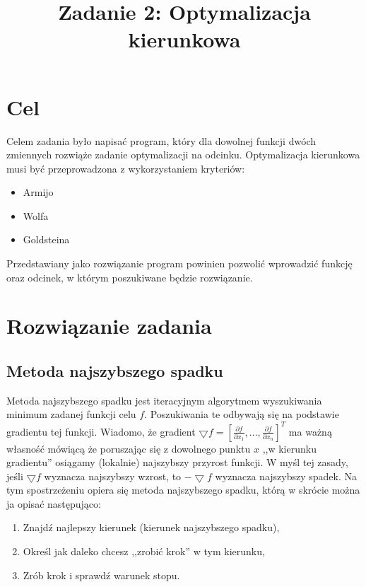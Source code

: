 \documentclass{classrep}
\author{
  \studentinfo{Paweł Musiał}{178726} \and
  \studentinfo{Łukasz Michalski}{178724}
}
\title{Zadanie 2: Optymalizacja kierunkowa}
\begin{document}
\maketitle


\addtocounter{footnote}{1}

\section{Cel}
Celem zadania było napisać program, który dla dowolnej funkcji dwóch zmiennych rozwiąże zadanie optymalizacji na odcinku. Optymalizacja kierunkowa musi być przeprowadzona z wykorzystaniem kryteriów:
\begin{itemize}
\item Armijo
\item Wolfa
\item Goldsteina
\end{itemize}
Przedstawiany jako rozwiązanie program powinien pozwolić wprowadzić funkcję oraz odcinek, w którym poszukiwane będzie rozwiązanie.

\section{Rozwiązanie zadania}
\subsection{Metoda najszybszego spadku}
Metoda najszybszego spadku jest iteracyjnym algorytmem wyszukiwania minimum zadanej funkcji celu $f$. Poszukiwania te odbywają się na podstawie gradientu tej funkcji. Wiadomo, że gradient $\bigtriangledown f=[\frac{\partial f}{\partial x_{1}},...,\frac{\partial f}{\partial x_{n}}]^T$ ma ważną własność mówiącą że poruszając się z dowolnego punktu $x$ ,,w kierunku gradientu'' osiągamy (lokalnie) najszybszy przyrost funkcji. W myśl tej zasady, jeśli $\bigtriangledown f$ wyznacza najszybszy wzrost, to $-\bigtriangledown f$ wyznacza najszybszy spadek. Na tym spostrzeżeniu opiera się metoda najszybszego spadku, którą w skrócie można ja opisać następująco:
\begin{enumerate}
\item Znajdź najlepszy kierunek (kierunek najszybszego spadku),
\item Określ jak daleko chcesz ,,zrobić krok'' w tym kierunku,
\item Zrób krok i sprawdź warunek stopu.
\end{enumerate}
\end{document}
